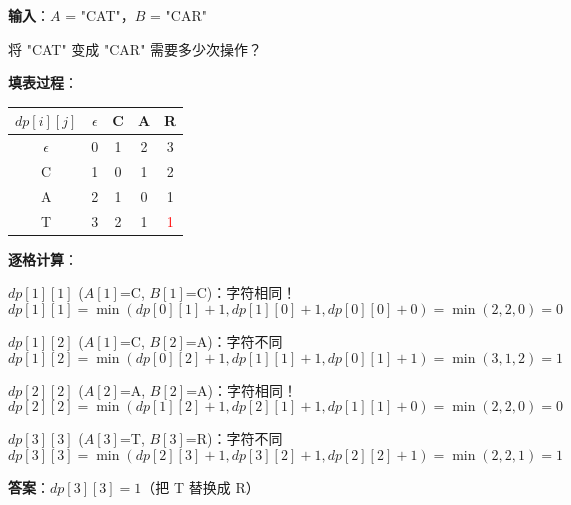 \documentclass[12pt, a4paper]{ctexart}
\begin{document}
\begin{blackboard}

\textbf{输入}：$A$ = "CAT"，$B$ = "CAR"

将 "CAT" 变成 "CAR" 需要多少次操作？

\textbf{填表过程}：

\begin{center}
\begin{tabular}{c|cccc}
$dp[i][j]$ & $\epsilon$ & C & A & R \\
\hline
$\epsilon$ & 0 & 1 & 2 & 3 \\
C & 1 & 0 & 1 & 2 \\
A & 2 & 1 & 0 & 1 \\
T & 3 & 2 & 1 & \textcolor{red}{1} \\
\end{tabular}
\end{center}

\textbf{逐格计算}：

$dp[1][1]$ ($A[1]$=C, $B[1]$=C)：字符相同！
\[
dp[1][1] = \min(dp[0][1]+1, dp[1][0]+1, dp[0][0]+0) = \min(2, 2, 0) = 0
\]

$dp[1][2]$ ($A[1]$=C, $B[2]$=A)：字符不同
\[
dp[1][2] = \min(dp[0][2]+1, dp[1][1]+1, dp[0][1]+1) = \min(3, 1, 2) = 1
\]

$dp[2][2]$ ($A[2]$=A, $B[2]$=A)：字符相同！
\[
dp[2][2] = \min(dp[1][2]+1, dp[2][1]+1, dp[1][1]+0) = \min(2, 2, 0) = 0
\]

$dp[3][3]$ ($A[3]$=T, $B[3]$=R)：字符不同
\[
dp[3][3] = \min(dp[2][3]+1, dp[3][2]+1, dp[2][2]+1) = \min(2, 2, 1) = 1
\]

\textbf{答案}：$dp[3][3] = 1$（把 T 替换成 R）

\end{blackboard}
\end{document}
